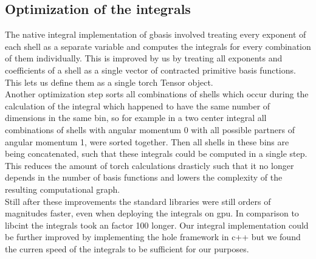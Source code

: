 \subsection{Optimization of the integrals}
The native integral implementation of gbasis involved treating every exponent of each shell as a separate variable and computes the integrals for every combination of them individually. This is improved by us by treating all exponents and coefficients of a shell as a single vector of contracted primitive basis functions. This lets us define them as a single torch Tensor object.\\
Another optimization step sorts all combinations of shells which occur during the calculation of the integral which happened to have the same number of dimensions in the same bin, so for example in a two center integral all combinations of shells with angular momentum 0 with all possible partners of angular momentum 1, were sorted together. Then all shells in these bins are being concatenated, such that these integrals could be computed in a single step. This reduces the amount of torch calculations drasticly such that it no longer depends in the number of basis functions and lowers the complexity of the resulting computational graph.\\
Still after these improvements the standard libraries were still orders of magnitudes faster, even when deploying the integrals on gpu.
In comparison to libcint\cite{sun_libcint_2015} the integrals took an factor 100 longer. Our integral implementation could be further improved by implementing the hole framework in c++ but we found the curren speed of the integrals to be sufficient for our purposes.